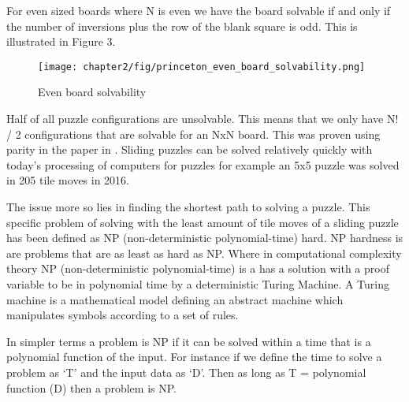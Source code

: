 For even sized boards where N is even we have the board solvable if and only if the number of
inversions plus the row of the blank square is odd. This is illustrated in Figure 3.

\begin{figure}[!htb]
	\centering
	\texttt{[image: chapter2/fig/princeton\_even\_board\_solvability.png]}
	\caption{Even board solvability \cite{princeton_8puzzle_assignment}}
	\label{fig:sol_even_board}
\end{figure}

Half of all puzzle configurations are unsolvable. \cite{Notes_15_puzzle} This means that we only have N! / 2 configurations
that are solvable for an NxN board. This was proven using parity in the paper in \cite{Notes_15_puzzle}. Sliding puzzles
can be solved relatively quickly with today’s processing of computers for puzzles for example an 5x5
puzzle was solved in 205 tile moves in 2016. \cite{Domain_cube_forum}

The issue more so lies in finding the shortest path to solving a puzzle. This specific problem of solving
with the least amount of tile moves of a sliding puzzle has been defined as NP (non-deterministic polynomial-time) hard. NP hardness is are problems that are as least as hard as NP.
Where in computational complexity theory NP (non-deterministic polynomial-time) is a has a solution
with a proof variable to be in polynomial time by a deterministic Turing Machine. A Turing machine is
a mathematical model defining an abstract machine which manipulates symbols according to a set of
rules. \cite{Computation_finite_and_infinite_machines}

In simpler terms a problem is NP if it can be solved within a time that is a polynomial function of the
input. For instance if we define the time to solve a problem as ‘T’ and the input data as ‘D’. Then as
long as T = polynomial function (D) then a problem is NP.